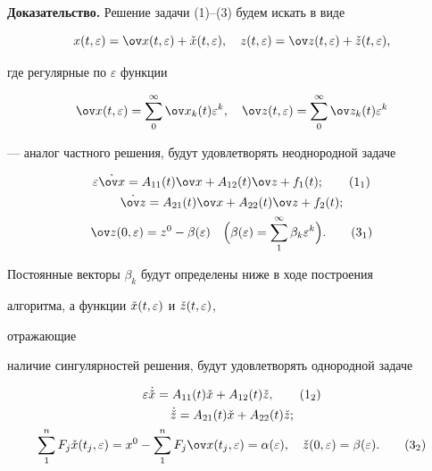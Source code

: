  


{\bf Доказательство.} Решение задачи (1)--(3) будем искать в виде 


$$ 


x(t,\varepsilon)=\ov x(t,\varepsilon)+\Check x(t,\varepsilon),\quad 


z(t,\varepsilon)=\ov z(t,\varepsilon)+\Check z(t,\varepsilon), 


$$ 


где регулярные по $\varepsilon$ функции 


\begin{equation} 


\ov x(t,\varepsilon)=\sum^\infty_0\ov x_k(t)\varepsilon^k,\quad 


\ov z(t,\varepsilon)=\sum^\infty_0\ov z_k(t)\varepsilon^k 


\end{equation} 


--- аналог частного решения, будут удовлетворять неоднородной задаче 


\begin{gather} 


\varepsilon\Dot{\ov x}=A_{11}(t)\ov x+A_{12}(t) 


\ov z+f_1(t);\tag{1$_1$} \\ 


\Dot{\ov z}=A_{21}(t)\ov x+A_{22}(t)\ov z+f_2(t);\notag \\ 


\ov z(0,\varepsilon)=z^0-\beta(\varepsilon)\quad 


\Big(\beta(\varepsilon)=\sum^\infty_1 \beta_k\varepsilon^k 


\Big).\tag{3$_1$} 


\end{gather} 


Постоянные векторы $\beta_k$ будут определены ниже в ходе построения 


алгоритма, а функции $\Check x(t,\varepsilon)$ и $\Check z(t,\varepsilon)$, 


отражающие 


наличие сингулярностей решения, будут удовлетворять однородной задаче 


\begin{gather} 


\varepsilon\DC{x}=A_{11}(t)\Check x+A_{12}(t)\Check z,\tag{1$_2$}\\ 


\DC{z}=A_{21}(t)\Check x+A_{22}(t)\Check z;\notag \\ 


\sum^n_1 F_j\Check x(t_j,\varepsilon)=x^0-\sum^n_1 


F_j\ov x(t_j,\varepsilon)=\alpha(\varepsilon),\quad 


\Check z(0,\varepsilon)=\beta(\varepsilon).\tag{3$_2$} 


\end{gather} 


